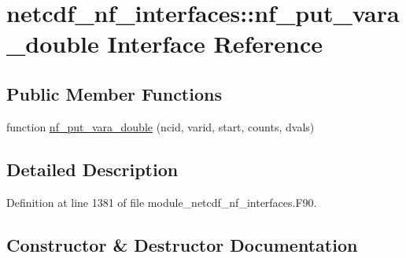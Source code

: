 \hypertarget{interfacenetcdf__nf__interfaces_1_1nf__put__vara__double}{}\section{netcdf\+\_\+nf\+\_\+interfaces\+:\+:nf\+\_\+put\+\_\+vara\+\_\+double Interface Reference}
\label{interfacenetcdf__nf__interfaces_1_1nf__put__vara__double}
\subsection*{Public Member Functions}
\begin{DoxyCompactItemize}
\item 
function \hyperlink{interfacenetcdf__nf__interfaces_1_1nf__put__vara__double_a5de9357e8e9b165840506acf810ba73a}{nf\+\_\+put\+\_\+vara\+\_\+double} (ncid, varid, start, counts, dvals)
\end{DoxyCompactItemize}


\subsection{Detailed Description}


Definition at line 1381 of file module\+\_\+netcdf\+\_\+nf\+\_\+interfaces.\+F90.



\subsection{Constructor \& Destructor Documentation}
\mbox{\label{interfacenetcdf__nf__interfaces_1_1nf__put__vara__double_a5de9357e8e9b165840506acf810ba73a}} 
